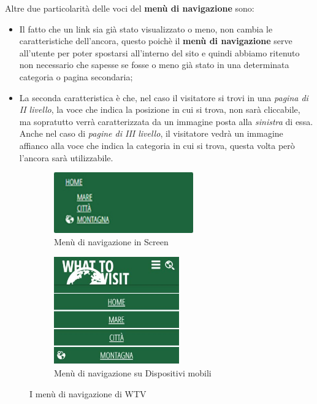 Altre due particolarità delle voci del \textbf{menù di navigazione} sono:
\begin{itemize}
\item Il fatto che un link sia già stato visualizzato o meno, non cambia le
caratteristiche dell'ancora, questo poichè il \textbf{menù di navigazione}
serve all'utente per poter spostarsi all'interno del sito e quindi abbiamo
ritenuto non necessario che sapesse se fosse o meno già stato in una
determinata categoria o pagina secondaria;
\item La seconda caratteristica è che, nel caso il visitatore si trovi in una
\textit{pagina di II livello}, la voce che indica la posizione in cui si
trova, non sarà cliccabile, ma sopratutto verrà caratterizzata da un immagine
posta alla \textit{sinistra} di essa. Anche nel caso di \textit{pagine di III
livello}, il visitatore vedrà un immagine affianco alla voce che indica la
categoria in cui si trova, questa volta però l'ancora sarà utilizzabile.
\end{itemize}
\begin{figure}[h!]
        \centering
        \begin{subfigure}[b]{0.3\textwidth}
                \includegraphics[height=2.63cm,width=6cm]{images/pres_nav.jpg}
                \caption{Menù di navigazione in Screen}
                \label{fig:Nav-screen}
        \end{subfigure}
        \hspace{4cm}
        \begin{subfigure}[b]{0.3\textwidth}
                \includegraphics[height=4.65cm,width=5.4cm]{images/pres_nav_m.jpg}
                \caption{Menù di navigazione su Dispositivi mobili}
                \label{fig:Nav-mobile}
        \end{subfigure}
        \caption{I menù di navigazione di WTV}\label{fig:Display-Nav}
\end{figure}

